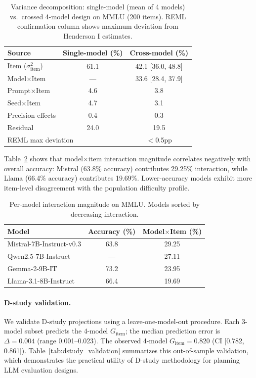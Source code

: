 \documentclass[11pt,letterpaper]{article}
\begin{document}
\begin{table}[t]
\centering
\caption{Variance decomposition: single-model (mean of 4 models) vs.\ crossed 4-model design on MMLU (200 items). REML confirmation column shows maximum deviation from Henderson I estimates.}
\label{tab:variance_decomp}
\small
\begin{tabular}{lcc}
\toprule
\textbf{Source} & \textbf{Single-model (\%)} & \textbf{Cross-model (\%)} \\
\midrule
Item ($\sigma^2_{\text{item}}$) & 61.1 & 42.1 [36.0, 48.8] \\
Model$\times$Item & --- & 33.6 [28.4, 37.9] \\
Prompt$\times$Item & 4.6 & 3.8 \\
Seed$\times$Item & 4.7 & 3.1 \\
Precision effects & 0.4 & 0.3 \\
Residual & 24.0 & 19.5 \\
\midrule
\multicolumn{2}{l}{REML max deviation} & $<$0.5pp \\
\bottomrule
\end{tabular}
\end{table}

Table~\ref{tab:per_model_interaction} shows that model$\times$item interaction magnitude correlates negatively with overall accuracy: Mistral (63.8\% accuracy) contributes 29.25\% interaction, while Llama (66.4\% accuracy) contributes 19.69\%. Lower-accuracy models exhibit more item-level disagreement with the population difficulty profile.

\begin{table}[t]
\centering
\caption{Per-model interaction magnitude on MMLU. Models sorted by decreasing interaction.}
\label{tab:per_model_interaction}
\small
\begin{tabular}{lcc}
\toprule
\textbf{Model} & \textbf{Accuracy (\%)} & \textbf{Model$\times$Item (\%)} \\
\midrule
Mistral-7B-Instruct-v0.3 & 63.8 & 29.25 \\
Qwen2.5-7B-Instruct & --- & 27.11 \\
Gemma-2-9B-IT & 73.2 & 23.95 \\
Llama-3.1-8B-Instruct & 66.4 & 19.69 \\
\bottomrule
\end{tabular}
\end{table}

\paragraph{D-study validation.} We validate D-study projections using a leave-one-model-out procedure. Each 3-model subset predicts the 4-model $G_{\text{item}}$; the median prediction error is $\Delta = 0.004$ (range 0.001--0.023). The observed 4-model $G_{\text{item}} = 0.820$ (CI [0.782, 0.861]). Table~\ref{tab:dstudy_validation} summarizes this out-of-sample validation, which demonstrates the practical utility of D-study methodology for planning LLM evaluation designs.
\end{document}
